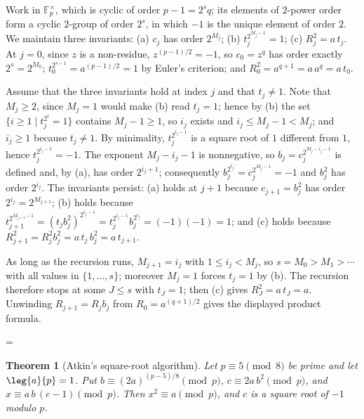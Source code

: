 \documentclass[11pt]{article}
\makeatletter
\theoremstyle{ntstyle}
\newtheorem{theorem}{Theorem}[subsection]
\let\nt@closedisplay\]
\def\nt@guardedclose{\@ifnextchar\par{\nt@closeafterpar}{\@ifnextchar\end{\postdisplaypenalty\@M\nt@closedisplay}{\nt@closedisplay}}}
\def\nt@closeafterpar\par{\@ifnextchar\par{\nt@closeafterpar}{\@ifnextchar\end{\postdisplaypenalty\@M\nt@closedisplay\par}{\nt@closedisplay\par}}}
\renewenvironment{proof}[1][\proofname]{\par
  \pushQED{\qed}\normalfont\topsep\medskipamount\edef\nt@afterproof{\@endparpenalty=\the\@endparpenalty\relax}\@beginparpenalty\@M\@endparpenalty\@M\let\]\nt@guardedclose\trivlist\item[]\textit{#1\@addpunct{.}} \ignorespaces}{\ifvmode\addpenalty\@M\fi\popQED\nt@afterproof\endtrivlist\@endpefalse}
\makeatother
\begin{document}
\begin{proof} Work in $\mathbb{F}_p^{\times}$, which is cyclic of
	order $p-1=2^s q$; its elements of $2$-power order form a cyclic
	$2$-group of order $2^{s}$, in which $-1$ is the unique element of
	order $2$. We maintain three invariants: (a) $c_j$ has order $2^{M_j}$;
	(b) $t_j^{2^{M_j-1}} = 1$; (c) $R_j^{2} = a\,t_j$. At $j = 0$,
	since $z$ is a non-residue, $z^{(p-1)/2} = -1$, so $c_0 = z^{q}$ has
	order exactly $2^{s} = 2^{M_0}$; $t_0^{2^{s-1}} = a^{(p-1)/2} = 1$ by
	Euler's criterion; and $R_0^{2} = a^{q+1} = a\,a^{q} = a\,t_0$.

	Assume that the three invariants hold at index $j$ and that $t_j \neq 1$. Note that $M_j
		\ge 2$, since $M_j = 1$ would make (b) read $t_j = 1$; hence by (b) the
	set $\{i \ge 1 \mid t_j^{2^{i}} = 1\}$ contains $M_j - 1 \ge 1$, so $i_j$
	exists and $i_j \le M_j - 1 < M_j$; and $i_j \ge 1$ because $t_j \neq
		1$. By minimality, $t_j^{2^{i_j-1}}$ is a square root of $1$ different
	from $1$, hence $t_j^{2^{i_j-1}} = -1$. The exponent $M_j - i_j - 1$ is
	nonnegative, so $b_j = c_j^{2^{M_j-i_j-1}}$ is defined and, by (a), has order
	$2^{i_j+1}$; consequently $b_j^{2^{i_j}} = c_j^{2^{M_j-1}} = -1$ and
	$b_j^{2}$ has order $2^{i_j}$. The invariants persist: (a) holds at $j+1$ because
	$c_{j+1} = b_j^{2}$ has order $2^{i_j} = 2^{M_{j+1}}$; (b) holds
	because $t_{j+1}^{2^{M_{j+1}-1}} = (t_jb_j^{2})^{2^{i_j-1}} =
		t_j^{2^{i_j-1}}b_j^{2^{i_j}} = (-1)(-1) = 1$; and (c) holds because
	$R_{j+1}^{2} = R_j^{2}b_j^{2} = a\,t_j\,b_j^{2} = a\,t_{j+1}$.

	As long as the recursion runs, $M_{j+1} = i_j$ with $1 \le i_j < M_j$,
	so $s = M_0 > M_1 > \cdots$ with all values in $\{1, \ldots, s\}$;
	moreover $M_j = 1$ forces $t_j = 1$ by (b). The recursion therefore
	stops at some $J \le s$ with $t_J = 1$; then (c) gives $R_J^{2} = a\,t_J = a$. Unwinding $R_{j+1} = R_jb_j$
	from $R_0 = a^{(q+1)/2}$ gives the displayed product formula.

\end{proof}
\begin{theorem}[Atkin's square-root algorithm]\label{thm:7.6.8} Let $p \equiv 5 \pmod{8}$ be prime and
	let $\leg{a}{p} = 1$. Put $b \equiv (2a)^{(p-5)/8} \pmod{p}$, $c \equiv 2a\,b^2 \pmod{p}$, and $x \equiv a\,b\,(c-1) \pmod{p}$.
	Then $x^2 \equiv a \pmod{p}$, and $c$ is a square root of $-1$ modulo $p$.

\end{theorem}
\end{document}
